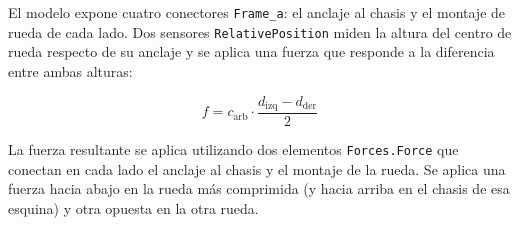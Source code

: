 
El modelo expone cuatro conectores \verb|Frame_a|: el anclaje al chasis y el montaje de rueda de cada lado. Dos sensores \verb|RelativePosition| miden la altura del centro de rueda respecto de su anclaje y se aplica una fuerza que responde a la diferencia entre ambas alturas:


\begin{equation}
    f = c_\text{arb} \cdot \frac{d_\text{izq} - d_\text{der}}{2}
    \label{eq:arb}
\end{equation}

La fuerza resultante se aplica utilizando dos elementos \verb|Forces.Force| que conectan en cada lado el anclaje al chasis y el montaje de la rueda. Se aplica una fuerza hacia abajo en la rueda más comprimida (y hacia arriba en el chasis de esa esquina) y otra opuesta en la otra rueda. \\


